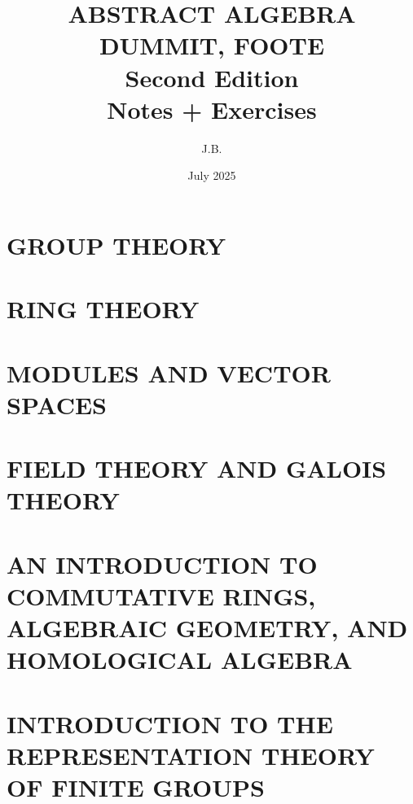 \documentclass[a4paper,10pt]{book}
\title{ABSTRACT ALGEBRA\\
    \large DUMMIT, FOOTE\\
    \large Second Edition\\
	\large Notes + Exercises\\
}
\author{J.B.}
\date{\small July 2025
}
\theoremstyle{plain} %
\theoremstyle{noparens}
\begin{document}
\maketitle
{\sffamily
\tableofcontents
}

\clearpage{}

\setcounter{chapter}{0}

\part{GROUP THEORY}






\part{RING THEORY}



\part{MODULES AND VECTOR SPACES}



\part{FIELD THEORY AND GALOIS THEORY}


\part{AN INTRODUCTION TO COMMUTATIVE RINGS, ALGEBRAIC GEOMETRY, AND HOMOLOGICAL ALGEBRA}



\part{INTRODUCTION TO THE REPRESENTATION THEORY OF FINITE GROUPS}




\end{document}
